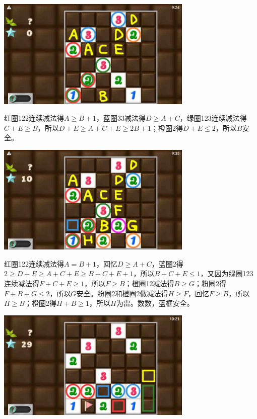 \subsection{} %
\begin{center}
    \includegraphics[width=0.7\textwidth]{puzzlelow/235-1.jpg}
\end{center}
红圈122连续减法得$A\ge B+1$，蓝圈33减法得$D\ge A+C$，绿圈123连续减法得$C+E\ge B$，所以$D+E\ge A+C+E\ge 2B+1$；橙圈2得$D+E\le 2$，所以$B$安全。
\begin{center}
    \includegraphics[width=0.7\textwidth]{puzzlelow/235-2.jpg}
\end{center}
红圈122连续减法得$A=B+1$，回忆$D\ge A+C$，蓝圈2得$2\ge D+E\ge A+C+E\ge B+C+E+1$，所以$B+C+E\le 1$，又因为绿圈123连续减法得$F+C+E\ge 1$，所以$F\ge B$；橙圈12减法得$B\ge G$；粉圈2得$F+B+G\le 2$，所以$G$安全。粉圈2和橙圈2做减法得$H\ge F$，回忆$F\ge B$，所以$H\ge B$；橙圈2得$H+B\ge 1$，所以$H$为雷。数数，蓝框安全。
\begin{center}
    \includegraphics[width=0.7\textwidth]{puzzlelow/235-3.jpg}
\end{center}
